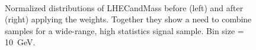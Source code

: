 \begin{figure}[htb]
    \begin{center}
        \\
    \end{center}
    \caption{Normalized distributions of LHECandMass before (left) and after (right) applying
        the weights. Together they show a need to combine samples for a wide-range, high
    statistics signal sample. Bin size = \SI{10}{\giga\electronvolt}.}
    \label{fig:LHE_raw}
\end{figure}

